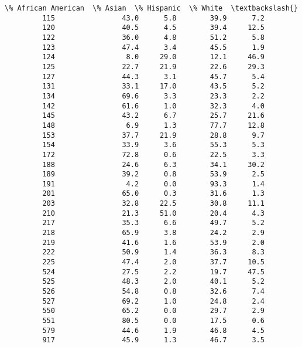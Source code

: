 \documentclass[11pt]{article}
\begin{document}
\begin{Verbatim}[commandchars=\\\{\}]
              \% African American  \% Asian  \% Hispanic  \% White  \textbackslash{}
         115                43.0      5.8        39.9      7.2   
         120                40.5      4.5        39.4     12.5   
         122                36.0      4.8        51.2      5.8   
         123                47.4      3.4        45.5      1.9   
         124                 8.0     29.0        12.1     46.9   
         125                22.7     21.9        22.6     29.3   
         127                44.3      3.1        45.7      5.4   
         131                33.1     17.0        43.5      5.2   
         134                69.6      3.3        23.3      2.2   
         142                61.6      1.0        32.3      4.0   
         145                43.2      6.7        25.7     21.6   
         148                 6.9      1.3        77.7     12.8   
         153                37.7     21.9        28.8      9.7   
         154                33.9      3.6        55.3      5.3   
         172                72.8      0.6        22.5      3.3   
         188                24.6      6.3        34.1     30.2   
         189                39.2      0.8        53.9      2.5   
         191                 4.2      0.0        93.3      1.4   
         201                65.0      0.3        31.6      1.3   
         203                32.8     22.5        30.8     11.1   
         210                21.3     51.0        20.4      4.3   
         217                35.3      6.6        49.7      5.2   
         218                65.9      3.8        24.2      2.9   
         219                41.6      1.6        53.9      2.0   
         222                50.9      1.4        36.3      8.3   
         225                47.4      2.0        37.7     10.5   
         524                27.5      2.2        19.7     47.5   
         525                48.3      2.0        40.1      5.2   
         526                54.8      0.8        32.6      7.4   
         527                69.2      1.0        24.8      2.4   
         550                65.2      0.0        29.7      2.9   
         551                80.5      0.0        17.5      0.6   
         579                44.6      1.9        46.8      4.5   
         917                45.9      1.3        46.7      3.5   
         

\end{Verbatim}
\end{document}
